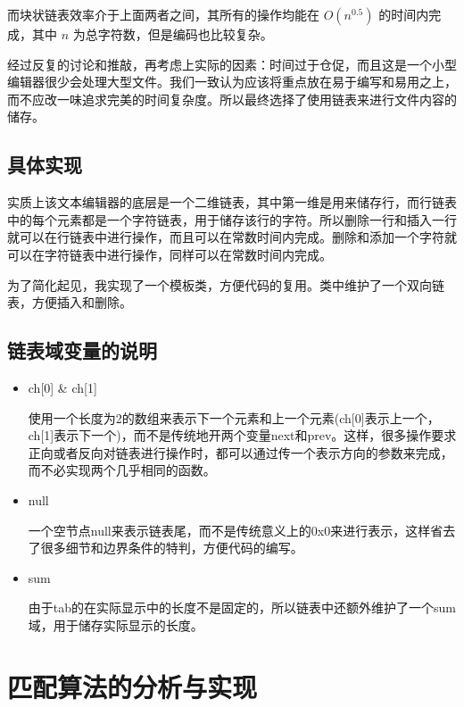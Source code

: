 \documentclass[a4paper,9pt]{article}
\begin{document}
而块状链表效率介于上面两者之间，其所有的操作均能在 $O(n^{0.5})$ 的时间内完成，其中 $n$ 为总字符数，但是编码也比较复杂。

经过反复的讨论和推敲，再考虑上实际的因素：时间过于仓促，而且这是一个小型编辑器很少会处理大型文件。我们一致认为应该将重点放在易于编写和易用之上，而不应改一味追求完美的时间复杂度。所以最终选择了使用链表来进行文件内容的储存。

\subsection{具体实现}
实质上该文本编辑器的底层是一个二维链表，其中第一维是用来储存行，而行链表中的每个元素都是一个字符链表，用于储存该行的字符。所以删除一行和插入一行就可以在行链表中进行操作，而且可以在常数时间内完成。删除和添加一个字符就可以在字符链表中进行操作，同样可以在常数时间内完成。

为了简化起见，我实现了一个模板类，方便代码的复用。类中维护了一个双向链表，方便插入和删除。

\subsection{链表域变量的说明}
\begin{itemize}
	\item{ch[0] \& ch[1]}

		使用一个长度为2的数组来表示下一个元素和上一个元素(ch[0]表示上一个，ch[1]表示下一个)，而不是传统地开两个变量next和prev。这样，很多操作要求正向或者反向对链表进行操作时，都可以通过传一个表示方向的参数来完成，而不必实现两个几乎相同的函数。

	\item{null}

		一个空节点null来表示链表尾，而不是传统意义上的0x0来进行表示，这样省去了很多细节和边界条件的特判，方便代码的编写。

	\item{sum}

		由于tab的在实际显示中的长度不是固定的，所以链表中还额外维护了一个sum域，用于储存实际显示的长度。
\end{itemize}

\section{匹配算法的分析与实现}
\end{document}
